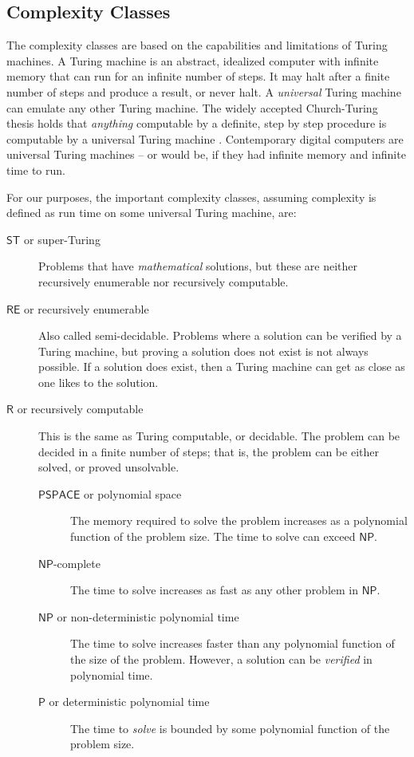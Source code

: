 \documentclass[11pt,papersize=a4]{scrartcl}
\begin{document}
 \subsection*{Complexity Classes} \label{sec:complexity}
 
 The complexity classes are based on the capabilities and limitations of Turing machines. A Turing machine is an abstract, idealized computer with infinite memory that can run for an infinite number of steps. It may halt after a finite number of steps and produce a result, or never halt. A \emph{universal} Turing machine can emulate any other Turing machine. The widely accepted Church-Turing thesis holds that \emph{anything} computable by a definite, step by step procedure is computable by a universal Turing machine \parencite{sep-church-turing}. Contemporary digital computers are universal Turing machines -- or would be, if they had infinite memory and infinite time to run.
 
 For our purposes, the important complexity classes, assuming complexity is defined as run time on some universal Turing machine, are:

\begin{description}
\item[$\mathsf{ST}$ or super-Turing] Problems that have \emph{mathematical} solutions, but these are neither recursively enumerable nor recursively computable.
\item[$\mathsf{RE}$ or recursively enumerable] Also called semi-decidable. Problems where a solution can be verified by a Turing machine, but proving a solution does not exist is not always possible. If a solution does exist, then a Turing machine can get as close as one likes to the solution.
\item[$\mathsf{R}$ or recursively computable] This is the same as Turing computable, or decidable. The problem can be decided in a finite number of steps; that is, the problem can be either solved, or proved unsolvable.
\begin{description}
\item[$\mathsf{PSPACE}$ or polynomial space] The memory required to solve the problem increases as a polynomial function of the problem size. The time to solve can exceed $\mathsf{NP}$.
\item[$\mathsf{NP}$-complete] The time to solve increases as fast as any other problem in $\mathsf{NP}$.
\item[$\mathsf{NP}$ or non-deterministic polynomial time ] The time to solve increases faster than any polynomial function of the size of the problem. However, a solution can be \emph{verified} in polynomial time.
\item[$\mathsf{P}$ or deterministic polynomial  time] The time to \emph{solve} is bounded by some polynomial function of the problem size.
\end{description}
\end{description}
\end{document}
